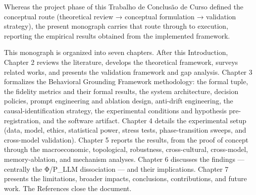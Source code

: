 Whereas the project phase of this Trabalho de Conclusão de Curso defined the conceptual route (theoretical review → conceptual formulation → validation strategy), the present monograph carries that route through to execution, reporting the empirical results obtained from the implemented framework.


This monograph is organized into seven chapters. After this Introduction, Chapter 2 reviews the literature, develops the theoretical framework, surveys related works, and presents the validation framework and gap analysis. Chapter 3 formalizes the Behavioral Grounding Framework methodology: the formal tuple, the fidelity metrics and their formal results, the system architecture, decision policies, prompt engineering and ablation design, anti-drift engineering, the causal-identification strategy, the experimental conditions and hypothesis pre-registration, and the software artifact. Chapter 4 details the experimental setup (data, model, ethics, statistical power, stress tests, phase-transition sweeps, and cross-model validation). Chapter 5 reports the results, from the proof of concept through the macroeconomic, topological, robustness, cross-cultural, cross-model, memory-ablation, and mechanism analyses. Chapter 6 discusses the findings — centrally the Φ/P\_LLM dissociation — and their implications. Chapter 7 presents the limitations, broader impacts, conclusions, contributions, and future work. The References close the document.

